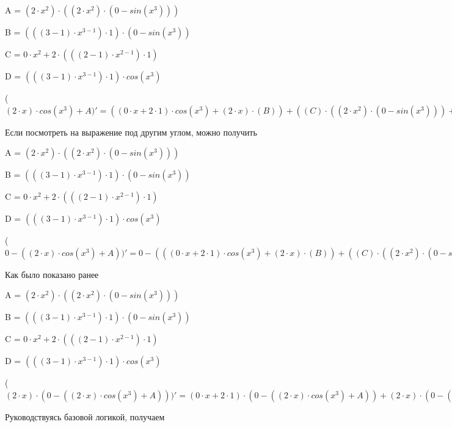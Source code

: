 \documentclass[12pt,a4paper,fleqn]{article}
\begin{document}
\begin{center}
A = $(2 \cdot x^{2}) \cdot ((2 \cdot x^{2}) \cdot (0-sin(x^{3})))$\end{center}
\begin{center}
B = $(((3-1) \cdot x^{3-1}) \cdot 1) \cdot (0-sin(x^{3}))$\end{center}
\begin{center}
C = $0 \cdot x^{2}+2 \cdot (((2-1) \cdot x^{2-1}) \cdot 1)$\end{center}
\begin{center}
D = $(((3-1) \cdot x^{3-1}) \cdot 1) \cdot cos(x^{3})$\end{center}
\begin{center}
 ($(2 \cdot x) \cdot cos(x^{3})+A)'
  = ((0 \cdot x+2 \cdot 1) \cdot cos(x^{3})+(2 \cdot x) \cdot (B))+((C) \cdot ((2 \cdot x^{2}) \cdot (0-sin(x^{3})))+(2 \cdot x^{2}) \cdot ((C) \cdot (0-sin(x^{3}))+(2 \cdot x^{2}) \cdot (0-D)))$\end{center}
Если посмотреть на выражение под другим углом, можно получить

\begin{center}
A = $(2 \cdot x^{2}) \cdot ((2 \cdot x^{2}) \cdot (0-sin(x^{3})))$\end{center}
\begin{center}
B = $(((3-1) \cdot x^{3-1}) \cdot 1) \cdot (0-sin(x^{3}))$\end{center}
\begin{center}
C = $0 \cdot x^{2}+2 \cdot (((2-1) \cdot x^{2-1}) \cdot 1)$\end{center}
\begin{center}
D = $(((3-1) \cdot x^{3-1}) \cdot 1) \cdot cos(x^{3})$\end{center}
\begin{center}
 ($0-((2 \cdot x) \cdot cos(x^{3})+A))'
  = 0-(((0 \cdot x+2 \cdot 1) \cdot cos(x^{3})+(2 \cdot x) \cdot (B))+((C) \cdot ((2 \cdot x^{2}) \cdot (0-sin(x^{3})))+(2 \cdot x^{2}) \cdot ((C) \cdot (0-sin(x^{3}))+(2 \cdot x^{2}) \cdot (0-D))))$\end{center}
Как было показано ранее

\begin{center}
A = $(2 \cdot x^{2}) \cdot ((2 \cdot x^{2}) \cdot (0-sin(x^{3})))$\end{center}
\begin{center}
B = $(((3-1) \cdot x^{3-1}) \cdot 1) \cdot (0-sin(x^{3}))$\end{center}
\begin{center}
C = $0 \cdot x^{2}+2 \cdot (((2-1) \cdot x^{2-1}) \cdot 1)$\end{center}
\begin{center}
D = $(((3-1) \cdot x^{3-1}) \cdot 1) \cdot cos(x^{3})$\end{center}
\begin{center}
 ($(2 \cdot x) \cdot (0-((2 \cdot x) \cdot cos(x^{3})+A)))'
  = (0 \cdot x+2 \cdot 1) \cdot (0-((2 \cdot x) \cdot cos(x^{3})+A))+(2 \cdot x) \cdot (0-(((0 \cdot x+2 \cdot 1) \cdot cos(x^{3})+(2 \cdot x) \cdot (B))+((C) \cdot ((2 \cdot x^{2}) \cdot (0-sin(x^{3})))+(2 \cdot x^{2}) \cdot ((C) \cdot (0-sin(x^{3}))+(2 \cdot x^{2}) \cdot (0-D)))))$\end{center}
Руководствуясь базовой логикой, получаем
\end{document}
